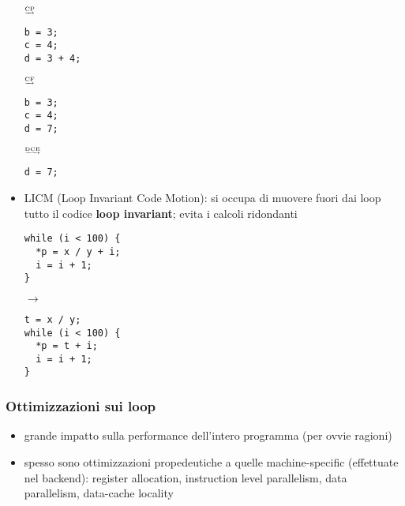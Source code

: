 \begin{itemize}
  \hfill $\tiny\underrightarrow{\text{CP}}$ \hfill
  \begin{minipage}[c]{.25\textwidth}
  \begin{lstlisting}
b = 3;
c = 4;
d = 3 + 4;\end{lstlisting}
  \end{minipage}
  \hfill $\tiny\underrightarrow{\text{CF}}$ \hfill
  \begin{minipage}[c]{.25\textwidth}
  \begin{lstlisting}
b = 3;
c = 4;
d = 7;\end{lstlisting}
  \end{minipage}
  \hfill $\tiny\underrightarrow{\text{DCE}}$ \hfill
  \begin{minipage}[c]{.25\textwidth}
  \begin{lstlisting}
d = 7;\end{lstlisting}
  \end{minipage}
\item LICM (Loop Invariant Code Motion): si occupa di muovere fuori dai loop tutto il codice \textbf{loop invariant}; evita i calcoli ridondanti\\
  \begin{minipage}[c]{.4\textwidth}
  \begin{lstlisting}
while (i < 100) {
  *p = x / y + i;
  i = i + 1;
}\end{lstlisting}
  \end{minipage}
  \hfill $\rightarrow$ \hfill
  \begin{minipage}[c]{.4\textwidth}
  \begin{lstlisting}
t = x / y;
while (i < 100) {
  *p = t + i;
  i = i + 1;
}\end{lstlisting}
  \end{minipage}
\end{itemize}

\subsubsection{Ottimizzazioni sui loop}

\begin{itemize}
  \item grande impatto sulla performance dell'intero programma (per ovvie ragioni)
  \item spesso sono ottimizzazioni propedeutiche a quelle machine-specific (effettuate nel backend): register allocation, instruction level parallelism, data parallelism, data-cache locality
\end{itemize}


